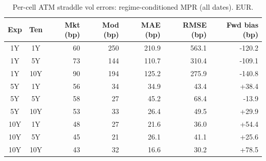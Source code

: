 \begin{table}[H]
\centering
\caption{Per-cell ATM straddle vol errors: regime-conditioned MPR (all dates). EUR.}
\label{tab:regime_mpr_per_cell_all}
\small
\begin{tabular}{@{}ccrrrrr@{}}
\toprule
\textbf{Exp} & \textbf{Ten} & \textbf{Mkt (bp)} & \textbf{Mod (bp)} & \textbf{MAE (bp)} & \textbf{RMSE (bp)} & \textbf{Fwd bias (bp)} \\
\midrule
  1Y & 1Y & 60 & 250 & 210.9 & 563.1 & -120.2 \\
  1Y & 5Y & 73 & 144 & 110.7 & 310.4 & -109.1 \\
  1Y & 10Y & 90 & 194 & 125.2 & 275.9 & -140.8 \\
  \midrule
  5Y & 1Y & 56 & 34 & 34.9 & 43.4 & +38.4 \\
  5Y & 5Y & 58 & 27 & 45.2 & 68.4 & -13.9 \\
  5Y & 10Y & 53 & 33 & 26.4 & 49.5 & +29.9 \\
  \midrule
  10Y & 1Y & 48 & 27 & 21.6 & 36.0 & +54.4 \\
  10Y & 5Y & 45 & 21 & 26.1 & 41.1 & +25.6 \\
  10Y & 10Y & 43 & 32 & 16.6 & 30.2 & +78.5 \\
\bottomrule
\end{tabular}
\end{table}